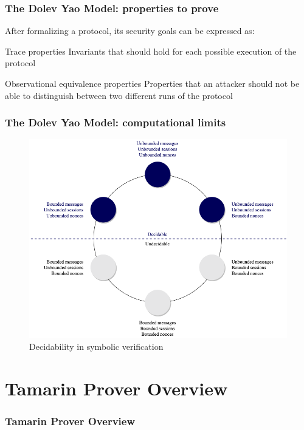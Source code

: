 \documentclass[aspectratio=169,t,xcolor=table]{beamer}
\begin{document}
\begin{frame}
    \frametitle{The Dolev Yao Model: properties to prove}

    After formalizing a protocol, its security goals can be expressed as:

    \begin{block}{Trace properties}
        Invariants that should hold for each possible execution of the protocol
    \end{block}

    \begin{block}{Observational equivalence properties}
        Properties that an attacker should not be able to distinguish between two different runs of the protocol
    \end{block}
\end{frame}

\begin{frame}
    \frametitle{The Dolev Yao Model: computational limits}

    \begin{figure}
        \centering
        \includegraphics[width=.6\textwidth]{images/decidabilitydiagram.png}
        \caption{Decidability in symbolic verification}
    \end{figure}
\end{frame}

\section{Tamarin Prover Overview}

\begin{frame}{}
    \frametitle{Tamarin Prover Overview}
\end{frame}
\end{document}
